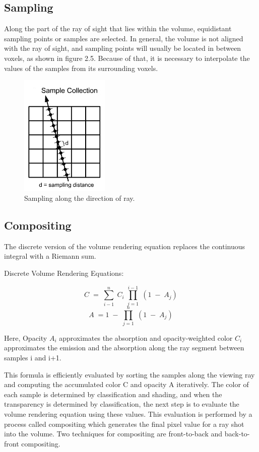 \subsection{Sampling} 

Along the part of the ray of sight that lies within the volume, equidistant sampling points or samples are selected. In general, the volume is not aligned with the ray of sight, and sampling points will usually be located in between voxels, as shown in figure 2.5. Because of that, it is necessary to interpolate the values of the samples from its surrounding voxels. 

\begin{figure}[h]
\centering
\includegraphics[width=120pt]{Images/sampling1.jpg}
\caption{\label{fig:ray_cast1.jpg} Sampling along the direction of ray.}
\end{figure}

\subsection{Compositing }

The discrete version of the volume rendering equation replaces the continuous integral with a Riemann sum. 

Discrete Volume Rendering Equations:

\begin{equation}
 C \; = \; \sum\limits_{i-1}^{n} \; C_i \; \prod\limits_{j=1}^{i-1} \; ( 1 \; - \; A_j) 
\end{equation}         
\begin{equation}
 A \; = 1 \; - \; \prod\limits_{j=1}^{n} \; ( 1 \; - \; A_j) 
\end{equation}

Here, Opacity $A_i$ approximates the absorption and opacity-weighted color $C_i$ approximates the emission and the absorption along the ray segment between samples i and i+1. 

This formula is efficiently evaluated by sorting the samples along the viewing ray and computing the accumulated color C and opacity A iteratively. The color of each sample is determined by classification and shading, and when the transparency is determined by classification, the next step is to evaluate the volume rendering equation using these values. This evaluation is performed by a process called compositing which generates the final pixel value for a ray shot into the volume. Two techniques for compositing  are front-to-back and back-to-front compositing.


